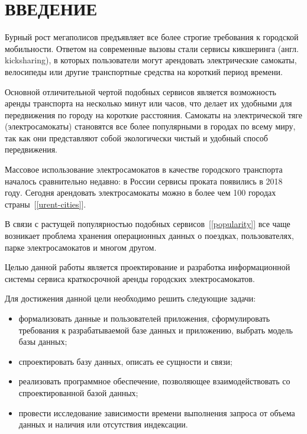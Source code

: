 \chapter*{ВВЕДЕНИЕ}

Бурный рост мегаполисов предъявляет все более строгие требования к городской мобильности. Ответом на современные вызовы стали сервисы кикшеринга (англ. kicksharing), в которых пользователи могут арендовать электрические самокаты, велосипеды или другие транспортные средства на короткий период времени.

Основной отличительной чертой подобных сервисов является возможность аренды транспорта на несколько минут или часов, что делает их удобными для передвижения по городу на короткие расстояния. Самокаты на электрической тяге (электросамокаты) становятся все более популярными в городах по всему миру, так как они представляют собой экологически чистый и удобный способ передвижения.

Массовое использование электросамокатов в качестве городского транспорта началось сравнительно недавно: в России сервисы проката появились в 2018 году. Сегодня арендовать электросамокаты можно в более чем 100 городах страны~[\ref{urent-cities}].

В связи с растущей популярностью подобных сервисов~[\ref{popularity}] все чаще возникает проблема хранения операционных данных о поездках, пользователях, парке электросамокатов и многом другом.

Целью данной работы является проектирование и разработка информационной системы сервиса краткосрочной аренды городских электросамокатов.

Для достижения данной цели необходимо решить следующие задачи:

\begin{itemize}
	\item формализовать данные и пользователей приложения, сформулировать требования к разрабатываемой базе данных и приложению, выбрать модель базы данных;
	\item спроектировать базу данных, описать ее сущности и связи;
	\item реализовать программное обеспечение, позволяющее взаимодействовать со спроектированной базой данных;
	\item провести исследование зависимости времени выполнения запроса от объема данных и наличия или отсутствия индексации.
\end{itemize}